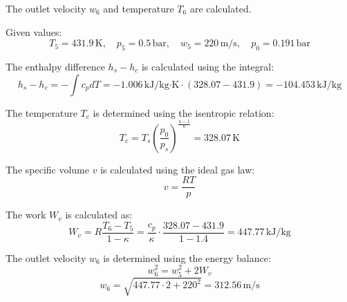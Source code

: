 The outlet velocity \( w_6 \) and temperature \( T_6 \) are calculated.  

Given values:  
\[
T_5 = 431.9 \, \text{K}, \quad p_5 = 0.5 \, \text{bar}, \quad w_5 = 220 \, \text{m/s}, \quad p_0 = 0.191 \, \text{bar}
\]

The enthalpy difference \( h_s - h_c \) is calculated using the integral:  
\[
h_s - h_c = -\int c_p dT = -1.006 \, \text{kJ/kg·K} \cdot (328.07 - 431.9) = -104.453 \, \text{kJ/kg}
\]

The temperature \( T_c \) is determined using the isentropic relation:  
\[
T_c = T_s \left( \frac{p_0}{p_s} \right)^{\frac{\kappa - 1}{\kappa}} = 328.07 \, \text{K}
\]

The specific volume \( v \) is calculated using the ideal gas law:  
\[
v = \frac{RT}{p}
\]

The work \( W_v \) is calculated as:  
\[
W_v = R \frac{T_6 - T_5}{1 - \kappa} = \frac{c_p}{\kappa} \cdot \frac{328.07 - 431.9}{1 - 1.4} = 447.77 \, \text{kJ/kg}
\]

The outlet velocity \( w_6 \) is determined using the energy balance:  
\[
w_6^2 = w_5^2 + 2W_v
\]
\[
w_6 = \sqrt{447.77 \cdot 2 + 220^2} = 312.56 \, \text{m/s}
\]